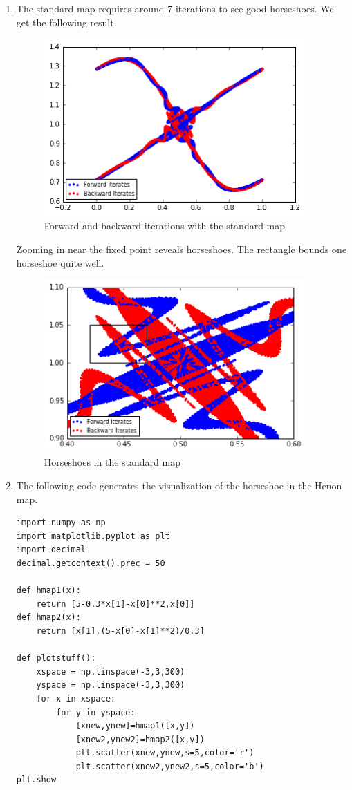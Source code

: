 \documentclass[a4paper,11pt]{article}
\begin{document}
\begin{enumerate}
\item
The standard map requires around 7 iterations to see good horseshoes. We get the following result.
	\begin{figure}[H]
		\centering
		\includegraphics[width=10cm]{stahorse}
		\caption{Forward and backward iterations with the standard map }
	\end{figure}
Zooming in near the fixed point reveals horseshoes. The rectangle bounds one horseshoe quite well.
	\begin{figure}[H]
		\centering
		\includegraphics[width=10cm]{standardhorse}
		\caption{Horseshoes in the standard map }
	\end{figure}
\item
The following code generates the visualization of the horseshoe in the Henon map.
	\begin{lstlisting}[style=MyPythonstyle]
import numpy as np
import matplotlib.pyplot as plt
import decimal
decimal.getcontext().prec = 50

def hmap1(x):
	return [5-0.3*x[1]-x[0]**2,x[0]]
def hmap2(x):
	return [x[1],(5-x[0]-x[1]**2)/0.3] 

def plotstuff():
	xspace = np.linspace(-3,3,300)
	yspace = np.linspace(-3,3,300)
	for x in xspace:
		for y in yspace:
			[xnew,ynew]=hmap1([x,y])
			[xnew2,ynew2]=hmap2([x,y])
			plt.scatter(xnew,ynew,s=5,color='r')
			plt.scatter(xnew2,ynew2,s=5,color='b')
plt.show


\end{lstlisting}
\end{enumerate}
\end{document}
